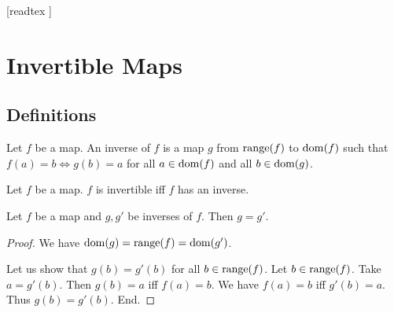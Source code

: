 \documentclass[10pt]{article}
\begin{document}
  \begin{imports}
    \begin{forthel}
      [readtex ]
    \end{forthel}
  \end{imports}


  \section*{Invertible Maps}

  \subsection*{Definitions}

  \begin{forthel}
    \begin{definition}
      Let $f$ be a map.
      An inverse of $f$ is a map $g$ from $\textrm{range}(f)$ to $\operatorname{dom}(f)$ such that $f(a) = b \iff g(b) = a$ for all $a \in \operatorname{dom}(f)$ and all $b \in \operatorname{dom}(g)$.
    \end{definition}
  \end{forthel}

  \begin{forthel}
    \begin{definition}
      Let $f$ be a map.
      $f$ is invertible iff $f$ has an inverse.
    \end{definition}
  \end{forthel}

  \begin{forthel}
    \begin{lemma}
      Let $f$ be a map and $g, g'$ be inverses of $f$.
      Then $g = g'$.
    \end{lemma}
    \begin{proof}
      We have $\operatorname{dom}(g) = \textrm{range}(f) = \operatorname{dom}(g')$.

      Let us show that $g(b) = g'(b)$ for all $b \in \textrm{range}(f)$.
        Let $b \in \textrm{range}(f)$.
        Take $a = g'(b)$.
        Then $g(b) = a$ iff $f(a) = b$.
        We have $f(a) = b$ iff $g'(b) = a$.
        Thus $g(b) = g'(b)$.
      End.
    \end{proof}
  \end{forthel}
\end{document}
